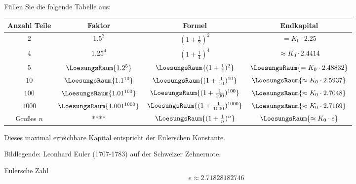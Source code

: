 Füllen Sie die folgende Tabelle aus:

\begin{tabular}{c|c|c|c} 
  Anzahl Teile  & Faktor                      & Formel          & Endkapital \\ \hline
  $2$           & $1.5^2$                      & $(1+\frac12)^2$ & $= K_0 \cdot{} 2.25 $ \\ \hline
  $4$           & $1.25^4$                  & $(1+\frac14)^4$ & $\approx K_0 \cdot{} 2.4414 $ \\ \hline
  $5$           & $\LoesungsRaum{1.2^5}$  & $\LoesungsRaum{(1+\frac14)^2}$ & $\LoesungsRaum{= K_0 \cdot{} 2.48832} $ \\ \hline
  $10$           & $\LoesungsRaum{1.1^{10}}$  & $\LoesungsRaum{(1+\frac{1}{10})^{10}}$ & $\LoesungsRaum{\approx K_0 \cdot{} 2.5937} $ \\ \hline
  $100$           & $\LoesungsRaum{1.01^{100}}$  & $\LoesungsRaum{(1+\frac{1}{100})^{100}}$ & $\LoesungsRaum{\approx K_0 \cdot{} 2.7048 }$ \\ \hline
  $1000$           & $\LoesungsRaum{1.001^{1000}}$  & $\LoesungsRaum{(1+\frac{1}{1000})^{1000}}$ & $\LoesungsRaum{\approx K_0 \cdot{} 2.7169 }$ \\ \hline
  Großes $n$           & ****  & $\LoesungsRaum{(1+\frac{1}{n})^{n}}$ & $\LoesungsRaum{\approx K_0 \cdot{} e }$ \\ \hline
\end{tabular} 

Dieses maximal erreichbare Kapital entspricht der Eulerschen
Konstante.

Bildlegende: Leonhard Euler (1707-1783) auf der Schweizer Zehnernote.

\begin{definition}{Eulersche Zahl}{}
$$e \approx 2.71828182746$$
\end{definition}
\newpage

